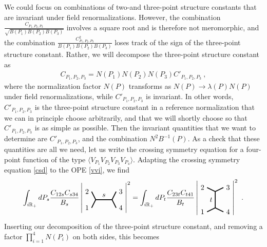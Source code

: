 \documentclass[12pt, a4paper, notitlepage, twoside]{report}
\numberwithin{equation}{section}
\theoremstyle{break}
\begin{document}
We could focus on combinations of two-and three-point structure constants that are invariant under field renormalizations. However, the combination $\frac{C_{P_1,P_2,P_3}}{\sqrt{B(P_1)B(P_2)B(P_3)}}$ involves a square root and is therefore not meromorphic, and the combination $\frac{C_{P_1,P_2,P_3}^2}{B(P_1)B(P_2)B(P_3)}$ loses track of the sign of the three-point structure constant. 
Rather, we will decompose the three-point structure constant as 
\begin{align}
 C_{P_1,P_2,P_3} = N(P_1)N(P_2)N(P_3)C'_{P_1,P_2,P_3}\ ,
\end{align}
where the normalization factor $N(P)$ transforms as $N(P)\to \lambda(P)N(P)$ under field renormalizations, while  $C'_{P_1,P_2,P_3}$ is invariant. In other words, $C'_{P_1,P_2,P_3}$ is the three-point structure constant in a reference normalization that we can in principle choose arbitrarily, and that we will shortly choose so that $C'_{P_1,P_2,P_3}$ is as simple as possible.
Then the invariant quantities that we want to determine are $C'_{P_1,P_2,P_3}$, and the combination $N^2B^{-1}(P)$. As a check that these quantities are all we need, let us write the crossing symmetry equation for a four-point function of the type $\langle V_{P_1}V_{P_2}V_{P_3}V_{P_4}\rangle$. Adapting the crossing symmetry equation \eqref{csd} to the 
OPE \eqref{vvi}, we find 
\begin{align}
 \int_{i\mathbb{R}_+} dP_s\frac{C_{12s} C_{s34}}{B_s} \left| 
 \begin{tikzpicture}[baseline=(current  bounding  box.center), very thick, scale = .2]
\draw (-1,2) node [left] {$2$} -- (0,0) -- node [above] {$s$} (4,0) -- (5,2) node [right] {$3$};
\draw (-1,-2) node [left] {$1$} -- (0,0);
\draw (4,0) -- (5,-2) node [right] {$4$};
\end{tikzpicture} 
\right|^2 = \int_{i\mathbb{R}_+} dP_t \frac{C_{23t}C_{t41}}{B_t} \left|
\begin{tikzpicture}[baseline=(current  bounding  box.center), very thick, scale = .2]
 \draw (-2,3) node [left] {$2$} -- (0,2) -- node [left] {$t$} (0,-2) -- (-2, -3) node [left] {$1$};
\draw (0,2) -- (2,3) node [right] {$3$};
\draw (0,-2) -- (2, -3) node [right] {$4$};
\end{tikzpicture}
\right|^2\ .
\label{gce}
\end{align}
Inserting our decomposition of the three-point structure constant, and 
removing a factor $\prod_{i=1}^4 N(P_i)$ on both sides, this becomes
\end{document}
